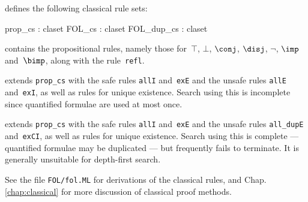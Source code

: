 {\FOL} defines the following classical rule sets:
\begin{ttbox} 
prop_cs    : claset
FOL_cs     : claset
FOL_dup_cs : claset
\end{ttbox}
\begin{ttdescription}
\item[\ttindexbold{prop_cs}] contains the propositional rules, namely
those for~$\top$, $\bot$, $\conj$, $\disj$, $\neg$, $\imp$ and~$\bimp$,
along with the rule~{\tt refl}.

\item[\ttindexbold{FOL_cs}] 
extends {\tt prop_cs} with the safe rules {\tt allI} and~{\tt exE}
and the unsafe rules {\tt allE} and~{\tt exI}, as well as rules for
unique existence.  Search using this is incomplete since quantified
formulae are used at most once.

\item[\ttindexbold{FOL_dup_cs}] 
extends {\tt prop_cs} with the safe rules {\tt allI} and~{\tt exE}
and the unsafe rules {\tt all_dupE} and~{\tt exCI}, as well as
rules for unique existence.  Search using this is complete --- quantified
formulae may be duplicated --- but frequently fails to terminate.  It is
generally unsuitable for depth-first search.
\end{ttdescription}
\noindent
See the file {\tt FOL/fol.ML} for derivations of the
classical rules, and 
%
        {Chap.\ts\ref{chap:classical}} 
for more discussion of classical proof methods.


